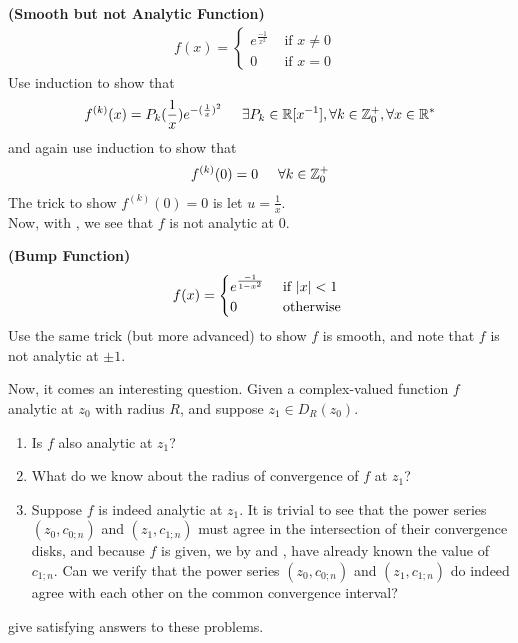 \documentclass{report}
\begin{document}
\begin{Example}{\textbf{(Smooth but not Analytic Function)}}{}
\begin{align*}
f(x)=\begin{cases}
  e^{\frac{-1}{x^2}}& \text{ if $x\neq 0$ }\\
  0& \text{ if $x=0$ }
\end{cases}
\end{align*}
Use induction to show that 
\begin{align*}
f^{(k)}(x)=P_k(\frac{1}{x})e^{-(\frac{1}{x})^2}\hspace{0.5cm}\exists P_k\in\mathbb{R}[x^{-1}],\forall k\in\mathbb{Z}^+_0,\forall x\in\mathbb{R}^*
\end{align*}
and again use induction to show that  
\begin{align*}
f^{(k)}(0)=0\hspace{0.5cm}\forall k\in\mathbb{Z}_0^+
\end{align*}
The trick to show $f^{(k)}(0)=0$ is let $u=\frac{1}{x}$.\\

Now, with , we see that $f$ is not analytic at $0$. 
\end{Example}
\begin{Example}{\textbf{(Bump Function)}}{}
\begin{align*}
f(x)=\begin{cases}
  e^{\frac{-1}{1-x^2}}& \text{ if $\left|x\right|<1$ }\\
  0& \text{ otherwise }
\end{cases}
\end{align*}
Use the same trick (but more advanced) to show $f$ is smooth, and note that $f$ is not analytic at $\pm 1$. 
\end{Example}
\begin{mdframed}
Now, it comes an interesting question. Given a complex-valued function $f$ analytic at $z_0$ with radius  $R$, and suppose $z_1\in D_R(z_0)$.
\begin{enumerate}[label=(\alph*)]
  \item Is $f$ also analytic at $z_1$?
   \item What do we know about the radius of convergence of $f$ at $z_1$?
   \item Suppose $f$ is indeed analytic at $z_1$. It is trivial to see that the power series $(z_0,c_{0;n})$ and $(z_1,c_{1;n})$ must agree in the intersection of their convergence disks, and because $f$ is given, we by  and , have already known the value of $c_{1;n}$. Can we verify that the power series  $(z_0,c_{0;n})$ and $(z_1,c_{1;n})$ do indeed agree with each other on the common convergence interval?
\end{enumerate}
 give satisfying answers to these problems. 
\end{mdframed}
\end{document}
